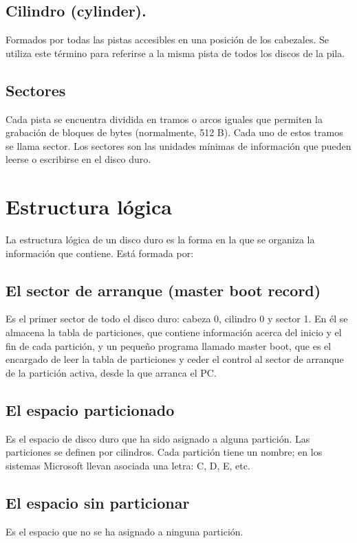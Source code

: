 \documentclass[11pt]{article}
\begin{document}
\subsection{Cilindro (cylinder).}
\label{sec:org60e2508}

Formados por todas las pistas accesibles en una posición de los cabezales. Se
utiliza este término para referirse a la misma pista de todos los discos de la pila.

\subsection{Sectores}
\label{sec:org537f0b5}

Cada pista se encuentra dividida en tramos o arcos iguales que permiten la grabación
de bloques de bytes (normalmente, 512 B). Cada uno de estos tramos se llama sector. Los sectores
son las unidades mínimas de información que pueden leerse o escribirse en el disco duro.

\section{Estructura lógica}
\label{sec:org2fc95ce}

La estructura lógica de un disco duro es la forma en la que se organiza la información
que contiene. Está formada por:

\subsection{El sector de arranque (master boot record)}
\label{sec:orgac4bb00}

Es el primer sector de todo el disco duro: cabeza 0, cilindro 0 y
sector 1. En él se almacena la tabla de particiones, que contiene información acerca del inicio y el fin de cada partición, y un pequeño programa
llamado master boot, que es el encargado de leer la tabla de particiones y ceder el
control al sector de arranque de la partición activa, desde la que arranca el PC.

\subsection{El espacio particionado}
\label{sec:org6b7cc9a}

   Es el espacio de disco duro que ha sido asignado a alguna partición. Las particiones se definen por cilindros. Cada partición tiene un nombre; en
los sistemas Microsoft llevan asociada una letra: C, D, E, etc.

\subsection{El espacio sin particionar}
\label{sec:orgeed30f4}

Es el espacio que no se ha asignado a ninguna partición.
\end{document}
